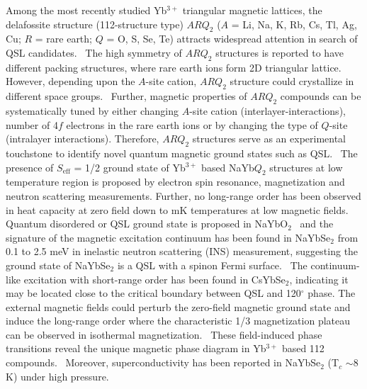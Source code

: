\documentclass[%
 aip,
 amsmath,amssymb,
 reprint,%
]{revtex4-1}
\begin{document}
Among the most recently studied Yb$^{3+}$ triangular magnetic lattices, the delafossite structure (112-structure type) $ARQ_2$ ($A$ = Li, Na, K, Rb, Cs, Tl, Ag, Cu; $R$ = rare earth; $Q$ = O, S, Se, Te) attracts widespread attention in search of QSL candidates.~\cite{liu2018rare,xing2019,jie2019naerse,zangeneh2019single,scheie2020crystal,bordelon2021frustrated} The high symmetry of $ARQ_2$ structures is reported to have different packing structures, where rare earth ions form 2D triangular lattice. However, depending upon the $A$-site cation, $ARQ_2$ structure could crystallize in different space groups.~\cite{xing2019} Further, magnetic properties of $ARQ_2$ compounds can be systematically tuned by either changing $A$-site cation (interlayer-interactions), number of 4$f$ electrons in the rare earth ions or by changing the type of $Q$-site (intralayer interactions). Therefore, $ARQ_2$ structures serve as an experimental touchstone to identify novel quantum magnetic ground states such as QSL.~\cite{liu2018rare,xing2019,jie2019naerse,zangeneh2019single,scheie2020crystal,gao2020crystal,xing2021stripe} The presence of $S_{\mathrm{eff}}$ = 1/2 ground state of Yb$^{3+}$ based NaYb$Q_2$ structures at low temperature region is proposed by electron spin resonance, magnetization and neutron scattering measurements.\cite{baenitz2018naybs,bordelon2020spin,zhang2021crystalline,sichelschmidt2020effective,guo2020magnetic,zhang2021effective,schmidt2021Yb} Further, no long-range order has been observed in heat capacity at zero field down to mK temperatures at low magnetic fields.~\cite{liu2018rare,ranjith2019field,Ranjith2019naybse,PhysRevB.100.220407,ding2019gapless,ma2020spin,ferreira2020frustrated,liybs2,iizuka2020single,zhang2020crystalline} Quantum disordered or QSL ground state is proposed in NaYbO$_2$~\cite{ranjith2019field,ding2019gapless,bordelon2019field} and the signature of the magnetic excitation continuum has been found in NaYbSe$_2$ from 0.1 to 2.5 meV in inelastic neutron scattering (INS) measurement, suggesting the ground state of NaYbSe$_2$ is a QSL with a spinon Fermi surface.~\cite{dai2021spinon} The continuum-like excitation with short-range order has been found in CsYbSe$_2$, indicating it may be located close to the critical boundary between QSL and 120$^{\circ}$ phase.\cite{xie2021field} The external magnetic fields could perturb the zero-field magnetic ground state and induce the long-range order where the characteristic 1/3 magnetization plateau can be observed in isothermal magnetization.~\cite{Ranjith2019naybse,PhysRevB.100.220407} These field-induced phase transitions reveal the unique magnetic phase diagram in Yb$^{3+}$ based 112 compounds.~\cite{maksimov2019anisotropic,yamamoto2014quantum} Moreover, superconductivity has been reported in NaYbSe$_2$ (T$_c$ $\sim$8 K) under high pressure.~\cite{jia2020mott,zhang2020pressure} 
\end{document}
